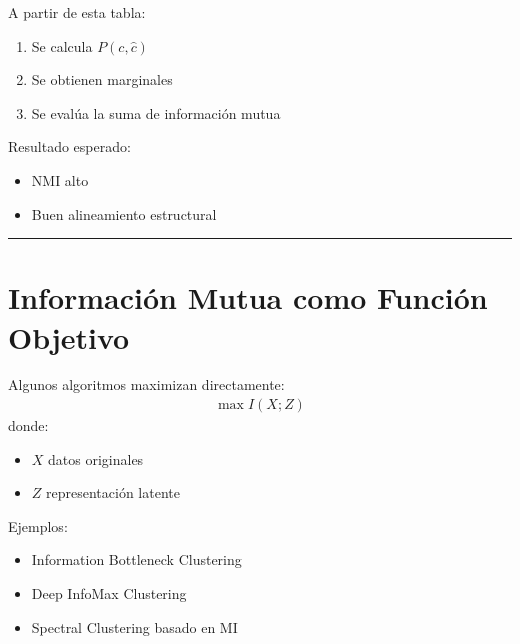 \documentclass[letterpaper,10pt,english]{jupyterBook}
\begin{document}
\sphinxAtStartPar
A partir de esta tabla:
\begin{enumerate}
%
\item {} 
\sphinxAtStartPar
Se calcula \(P(c,\hat{c})\)

\item {} 
\sphinxAtStartPar
Se obtienen marginales

\item {} 
\sphinxAtStartPar
Se evalúa la suma de información mutua

\end{enumerate}

\sphinxAtStartPar
Resultado esperado:
\begin{itemize}
\item {} 
\sphinxAtStartPar
NMI alto

\item {} 
\sphinxAtStartPar
Buen alineamiento estructural

\end{itemize}


\bigskip\hrule\bigskip



\section{Información Mutua como Función Objetivo}
\label{\detokenize{04_data_science_applications/clustering_mi:informacion-mutua-como-funcion-objetivo}}
\sphinxAtStartPar
Algunos algoritmos maximizan directamente:
\begin{equation*}
\begin{split}
\max I(X;Z)
\end{split}
\end{equation*}
\sphinxAtStartPar
donde:
\begin{itemize}
\item {} 
\sphinxAtStartPar
\(X\) datos originales

\item {} 
\sphinxAtStartPar
\(Z\) representación latente

\end{itemize}

\sphinxAtStartPar
Ejemplos:
\begin{itemize}
\item {} 
\sphinxAtStartPar
Information Bottleneck Clustering

\item {} 
\sphinxAtStartPar
Deep InfoMax Clustering

\item {} 
\sphinxAtStartPar
Spectral Clustering basado en MI

\end{itemize}
\end{document}
